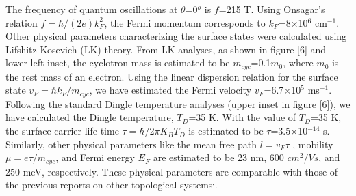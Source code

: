 \documentclass[aps,prb,twocolumn,showpacs,groupedaddress]{revtex4-1}
\begin{document}
\indent The frequency of quantum oscillations at $\theta$=0$^{o}$ is $f$=215 T. Using Onsagar's relation $f=\hbar/(2e)k_{F}^2$, the Fermi momentum corresponds to $k_F$=8$\times$10$^6$ cm$^{-1}$. Other physical parameters characterizing the surface states were calculated using Lifshitz Kosevich (LK) theory\cite{Shoenberg:22}. From LK analyses, as shown in figure [6] and lower left inset, the cyclotron mass is estimated to be $m_{cyc}$=0.1$m_0$, where $m_0$ is the rest mass of an electron. Using the linear dispersion relation for the surface state
$v_F=\hbar k_F/m_{cyc}$, we have estimated the Fermi velocity $v_F$=6.7$\times$10$^{5}$ ms$^{-1}$. Following the standard Dingle temperature analyses (upper inset in figure [6]), we have calculated the Dingle temperature, $T_D$=35 K. With the value of $T_D$=35 K, the surface carrier life time $\tau=\hbar/2\pi K_BT_D$ is estimated to be $\tau$=3.5$\times$10$^{-14}$ s. Similarly, other physical parameters like the mean free path $l=v_F\tau$ , mobility $\mu=e\tau/m_{cyc}$, and Fermi energy $E_F$ are estimated to be 23 nm, 600 $cm^2/V s$, and 250 meV, respectively. These physical parameters are comparable with those of the previous reports on other topological systems\cite{Ren:21}$^,$\cite{Pan:23}.
\end{document}
